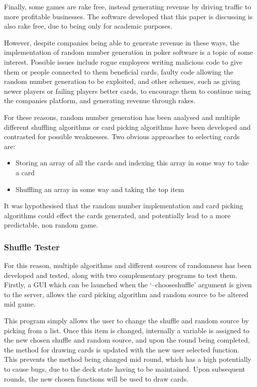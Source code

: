 Finally, some games are rake free, instead generating revenue by driving
traffic to more profitable businesses. The software developed that this paper
is discussing is also rake free, due to being only for academic purposes.

However, despite companies being able to generate revenue in these ways, the
implementation of random number generation in poker software is a topic of
some interest. Possible issues include rogue employees writing malicious
code to give them or people connected to them beneficial cards, faulty code
allowing the random number generation to be exploited, and other schemes, such
as giving newer players or failing players better cards, to encourage them to 
continue using the companies platform, and generating revenue through rakes.

For these reasons, random number generation has been analysed and multiple
different shuffling algorithms or card picking algorithms have been
developed and contrasted for possible weaknesses. Two obvious approaches to 
selecting cards are:

\begin{itemize}
    \item Storing an array of all the cards and indexing this array in some way to take a card
    \item Shuffling an array in some way and taking the top item
\end{itemize}

It was hypothesised that the random number implementation and card picking
algorithms could effect the cards generated, and potentially lead to a more
predictable, non random game.

\subsubsection{Shuffle Tester}\label{section:shuffletester}

For this reason, multiple algorithms and
different sources of randomness has been developed and tested, along with two
complementary programs to test them. Firstly, a GUI which can be launched
when the `--chooseshuffle' argument is given to the server, allows the card
picking algorithm and random source to be altered mid game.

This program simply allows the user to change the shuffle and random source
by picking from a list. Once this item is changed, internally a variable is
assigned to the new chosen shuffle and random source, and upon the round
being completed, the method for drawing cards is updated with the new user
selected function. This prevents the method being changed mid round, which
has a high potentially to cause bugs, due to the deck state having to be
maintained. Upon subsequent rounds, the new chosen functions will be used
to draw cards.

